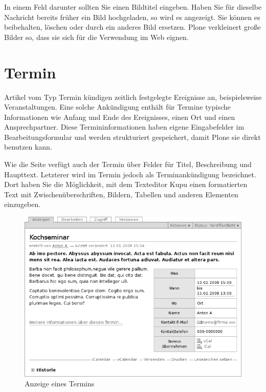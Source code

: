 \documentclass[a4paper,12pt,ngerman]{manual}
\begin{document}
In einem Feld darunter sollten Sie einen Bildtitel eingeben. Haben Sie für
dieselbe Nachricht bereits früher ein Bild hochgeladen, so wird es
angezeigt. Sie können es beibehalten, löschen oder durch ein anderes Bild
ersetzen. Plone verkleinert große Bilder so, dass sie sich für die Verwendung
im Web eignen.

\resetcurrentobjects
\hypertarget{--doc-inhaltstypen/termin}{}

\hypertarget{sec-termin}{}\section{Termin}

Artikel vom Typ Termin kündigen zeitlich festgelegte Ereignisse an,
beispielsweise Veranstaltungen. Eine solche Ankündigung enthält für Termine
typische Informationen wie Anfang und Ende des Ereignisses, einen Ort und
einen Ansprechpartner. Diese Termininformationen haben eigene Eingabefelder im
Bearbeitungsformular und werden strukturiert gespeichert, damit Plone sie
direkt benutzen kann.

Wie die Seite verfügt auch der Termin über Felder für Titel, Beschreibung und
Haupttext. Letzterer wird im Termin jedoch als Terminankündigung bezeichnet.
Dort haben Sie die Möglichkeit, mit dem Texteditor Kupu einen formatierten Text
mit Zwischenüberschriften, Bildern, Tabellen und anderen Elementen einzugeben.
\hypertarget{fig-termin}{}\begin{figure}[htbp]
\centering

\includegraphics{termin.png}
\caption{Anzeige eines Termins}\end{figure}
\end{document}
